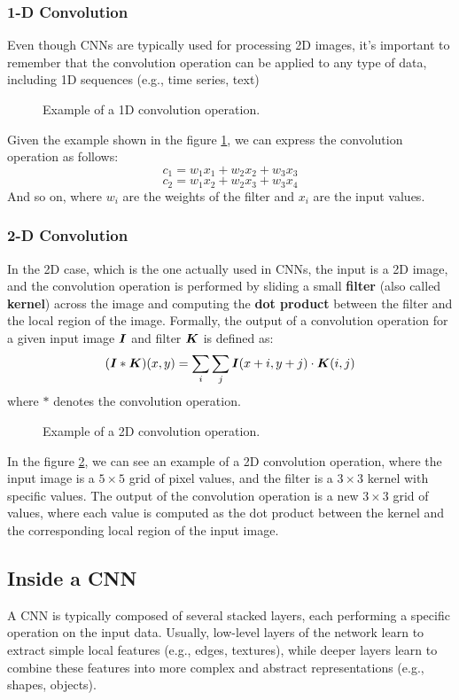 \subsubsection{1-D Convolution}
Even though CNNs are typically used for processing 2D images, it's important to remember that the convolution operation can be applied to any type of data, including 1D sequences (e.g., time series, text)
\begin{figure}[H]
    \centering
    
    \caption{Example of a 1D convolution operation.}
    \label{fig:1D-convolution}
\end{figure}
Given the example shown in the figure \ref{fig:1D-convolution}, we can express the convolution operation as follows:
$$ c_1 = w_1 x_1 + w_2 x_2 + w_3 x_3 $$
$$ c_2 = w_1 x_2 + w_2 x_3 + w_3 x_4 $$
And so on, where $w_i$ are the weights of the filter and $x_i$ are the input values.

\subsubsection{2-D Convolution}
In the 2D case, which is the one actually used in CNNs, the input is a 2D image, and the convolution operation is performed by 
sliding a small \textbf{filter} (also called \textbf{kernel}) across the image and computing the \textbf{dot product} between the filter and the local region of the image.
Formally, the output of a convolution operation for a given input image $\boldsymbol{I}$ and filter $\boldsymbol{K}$ is defined as:
$$ (\boldsymbol{I} * \boldsymbol{K})(x, y) = \sum_{i} \sum_{j} \boldsymbol{I}(x+i, y+j) \cdot \boldsymbol{K}(i, j) $$
where $ * $ denotes the convolution operation.

\begin{figure}[H]
    \centering
    
    \caption{Example of a 2D convolution operation.}
    \label{fig:2D-convolution}
\end{figure}
In the figure \ref{fig:2D-convolution}, we can see an example of a 2D convolution operation, where the input image is a $5 \times 5$ grid of pixel values, and the filter is a $3 \times 3$ kernel with specific values. 
The output of the convolution operation is a new $3 \times 3$ grid of values, where each value is computed as the dot product between the kernel and the corresponding local region of the input image.

\subsection{Inside a CNN}
A CNN is typically composed of several stacked layers, each performing a specific operation on the input data. 
Usually, low-level layers of the network learn to extract simple local features (e.g., edges, textures), while deeper layers learn to combine these features 
into more complex and abstract representations (e.g., shapes, objects).

